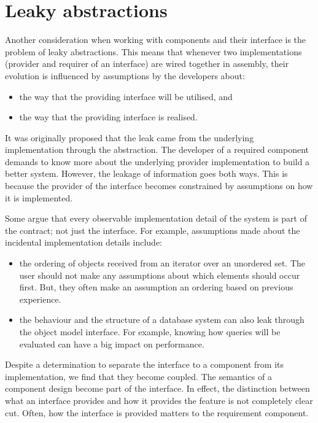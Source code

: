 \documentclass[a4paper, openany]{memoir}
\begin{document}
\section{Leaky abstractions}
Another consideration when working with components and their interface is the problem of leaky abstractions. This means that whenever two implementations (provider and requirer of an interface) are wired together in assembly, their evolution is influenced by assumptions by the developers about:
\begin{itemize}
    \item the way that the providing interface will be utilised, and 
    \item the way that the providing interface is realised.
\end{itemize}

It was originally proposed that the leak came from the underlying implementation through the abstraction. The developer of a required component demands to know more about the underlying provider implementation to build a better system. However, the leakage of information goes both ways. This is because the provider of the interface becomes constrained by assumptions on how it is implemented. 

Some argue that every observable implementation detail of the system is part of the contract; not just the interface. For example, assumptions made about the incidental implementation details include:
\begin{itemize}
    \item the ordering of objects received from an iterator over an unordered set. The user should not make any assumptions about which elements should occur first. But, they often make an assumption an ordering based on previous experience. 
    \item the behaviour and the structure of a database system can also leak through the object model interface. For example, knowing how queries will be evaluated can have a big impact on performance.
\end{itemize}

Despite a determination to separate the interface to a component from its implementation, we find that they become coupled. The semantics of a component design become part of the interface. In effect, the distinction between what an interface provides and how it provides the feature is not completely clear cut. Often, how the interface is provided matters to the requirement component.
\end{document}

